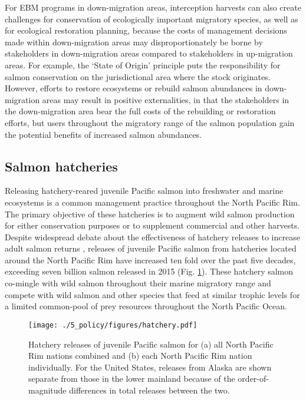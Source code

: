 For EBM programs in down-migration areas, interception harvests can also
create challenges for conservation of ecologically important migratory species,
as well as for ecological restoration planning, because the costs of management
decisions made within down-migration areas may disproportionately be borne by
stakeholders in down-migration areas compared to stakeholders in
up-migration areas. For example, the `State of Origin' principle puts the
responsibility for salmon conservation on the jurisdictional area where the
stock originates. However, efforts to restore ecosystems or rebuild salmon
abundances in down-migration areas may result in positive externalities, in that
the stakeholders in the down-migration area bear the full costs of the
rebuilding or restoration efforts, but users throughout the migratory range of
the salmon population gain the potential benefits of increased salmon
abundances.


\subsection{Salmon hatcheries}

Releasing hatchery-reared juvenile Pacific salmon into freshwater and marine
ecosystems is a common management practice throughout the North Pacific Rim. The
primary objective of these hatcheries is to augment wild salmon production for
either conservation purposes or to supplement commercial and other harvests.
Despite widespread debate about the effectiveness of hatchery releases to
increase adult salmon returns \citep{Hilborn2000a, Wertheimer2001a,
Hilborn2001a}, releases of juvenile Pacific salmon from hatcheries located
around the North Pacific Rim have increased ten fold over the past five decades,
exceeding seven billion salmon released in 2015 (Fig. \ref{fig:ebm:3}). These
hatchery salmon co-mingle with wild salmon throughout their marine migratory
range and compete with wild salmon and other species that feed at similar
trophic levels for a limited common-pool of prey resources throughout the North
Pacific Ocean.

\begin{figure}[htbp]
  \centering \texttt{[image: ./5\_policy/figures/hatchery.pdf]}
  \caption[Hatchery releases of juvenile Pacific salmon from North Pacific Rim
           nations]{Hatchery releases of juvenile Pacific salmon for (a) all
           North Pacific Rim nations combined and (b) each North Pacific Rim
           nation individually. For the United States, releases from Alaska are
           shown separate from those in the lower mainland because of the
           order-of-magnitude differences in total releases between the two.}
  \label{fig:ebm:3}
\end{figure}

